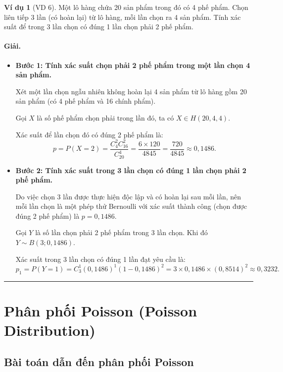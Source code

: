 \documentclass[12pt,a4paper]{article}
\theoremstyle{definition}
\newtheorem{vidu}{Ví dụ}[section]
\begin{document}
\begin{vidu}[VD 6]
Một lô hàng chứa 20 sản phẩm trong đó có 4 phế phẩm. Chọn liên tiếp 3 lần (có hoàn lại) từ lô hàng, mỗi lần chọn ra 4 sản phẩm. Tính xác suất để trong 3 lần chọn có đúng 1 lần chọn phải 2 phế phẩm.

\paragraph{Giải.}
\begin{itemize}
    \item \textbf{Bước 1: Tính xác suất chọn phải 2 phế phẩm trong một lần chọn 4 sản phẩm.}
    
    Xét một lần chọn ngẫu nhiên không hoàn lại 4 sản phẩm từ lô hàng gồm 20 sản phẩm (có 4 phế phẩm và 16 chính phẩm).
    
    Gọi $X$ là số phế phẩm chọn phải trong lần đó, ta có $X \in H(20, 4, 4)$.
    
    Xác suất để lần chọn đó có đúng 2 phế phẩm là:
    \[
    p = P(X = 2) = \frac{C_4^2 C_{16}^2}{C_{20}^4} = \frac{6 \times 120}{4845} = \frac{720}{4845} \approx 0{,}1486.
    \]

    \item \textbf{Bước 2: Tính xác suất trong 3 lần chọn có đúng 1 lần chọn phải 2 phế phẩm.}
    
    Do việc chọn 3 lần được thực hiện độc lập và có hoàn lại sau mỗi lần, nên mỗi lần chọn là một phép thử Bernoulli với xác suất thành công (chọn được đúng 2 phế phẩm) là $p = 0{,}1486$.
    
    Gọi $Y$ là số lần chọn phải 2 phế phẩm trong 3 lần chọn. Khi đó $Y \sim B(3; 0{,}1486)$.
    
    Xác suất trong 3 lần chọn có đúng 1 lần đạt yêu cầu là:
    \[
    p_1 = P(Y = 1) = C_3^1 (0{,}1486)^1 (1 - 0{,}1486)^2 = 3 \times 0{,}1486 \times (0{,}8514)^2 \approx 0{,}3232.
    \]
\end{itemize}
\end{vidu}

\vspace{1.5em}
\hrule
\vspace{1.5em}

\section{Phân phối Poisson (Poisson Distribution)}

\subsection{Bài toán dẫn đến phân phối Poisson}
\end{document}
